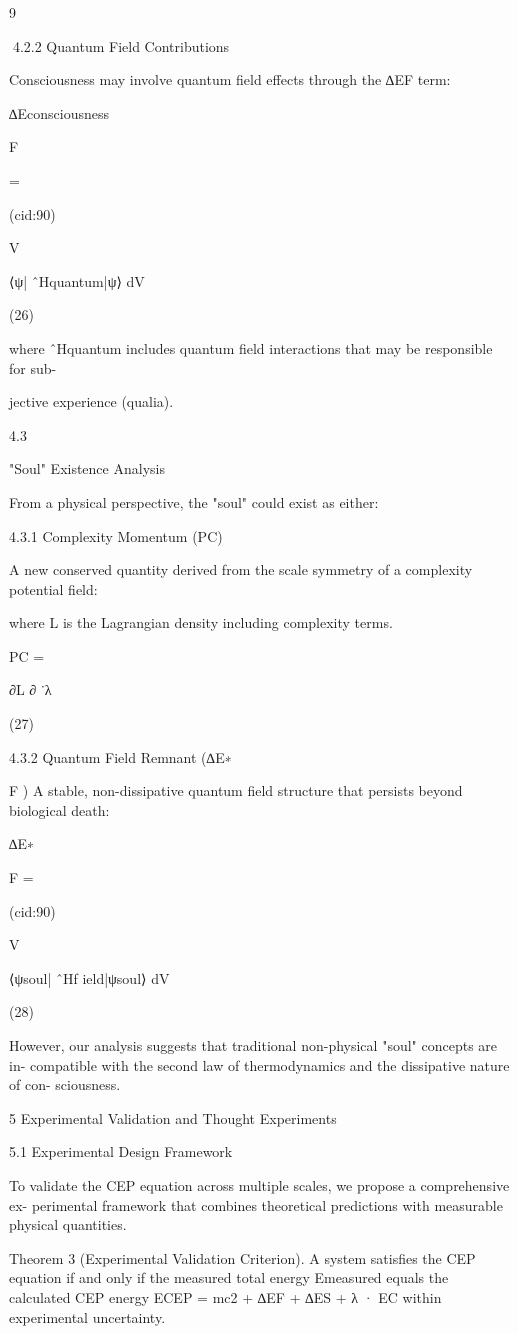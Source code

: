 9

4.2.2 Quantum Field Contributions

Consciousness may involve quantum field effects through the ∆EF term:

∆Econsciousness

F

=

(cid:90)

V

⟨ψ| ˆHquantum|ψ⟩ dV

(26)

where ˆHquantum includes quantum field interactions that may be responsible for sub-

jective experience (qualia).

4.3

"Soul" Existence Analysis

From a physical perspective, the "soul" could exist as either:

4.3.1 Complexity Momentum (PC)

A new conserved quantity derived from the scale symmetry of a complexity potential
field:

where L is the Lagrangian density including complexity terms.

PC =

∂L
∂ ˙λ

(27)

4.3.2 Quantum Field Remnant (∆E∗

F )
A stable, non-dissipative quantum field structure that persists beyond biological death:

∆E∗

F =

(cid:90)

V

⟨ψsoul| ˆHf ield|ψsoul⟩ dV

(28)

However, our analysis suggests that traditional non-physical "soul" concepts are in-
compatible with the second law of thermodynamics and the dissipative nature of con-
sciousness.

5 Experimental Validation and Thought Experiments

5.1 Experimental Design Framework

To validate the CEP equation across multiple scales, we propose a comprehensive ex-
perimental framework that combines theoretical predictions with measurable physical
quantities.

Theorem 3 (Experimental Validation Criterion). A system satisfies the CEP equation
if and only if the measured total energy Emeasured equals the calculated CEP energy
ECEP = mc2 + ∆EF + ∆ES + λ · EC within experimental uncertainty.

